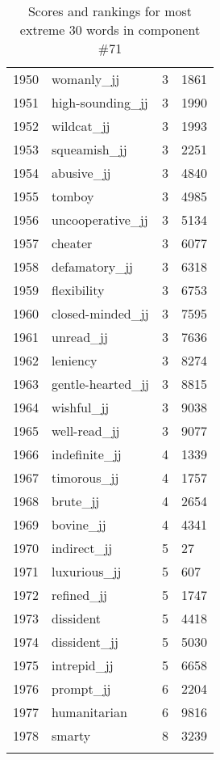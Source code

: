 \begin{longtable}[!htbp]{| rlr@{.}l |}
    1950 & womanly\_jj & 3 & 1861 \\
    1951 & high-sounding\_jj & 3 & 1990 \\
    1952 & wildcat\_jj & 3 & 1993 \\
    1953 & squeamish\_jj & 3 & 2251 \\
    1954 & abusive\_jj & 3 & 4840 \\
    1955 & tomboy & 3 & 4985 \\
    1956 & uncooperative\_jj & 3 & 5134 \\
    1957 & cheater & 3 & 6077 \\
    1958 & defamatory\_jj & 3 & 6318 \\
    1959 & flexibility & 3 & 6753 \\
    1960 & closed-minded\_jj & 3 & 7595 \\
    1961 & unread\_jj & 3 & 7636 \\
    1962 & leniency & 3 & 8274 \\
    1963 & gentle-hearted\_jj & 3 & 8815 \\
    1964 & wishful\_jj & 3 & 9038 \\
    1965 & well-read\_jj & 3 & 9077 \\
    1966 & indefinite\_jj & 4 & 1339 \\
    1967 & timorous\_jj & 4 & 1757 \\
    1968 & brute\_jj & 4 & 2654 \\
    1969 & bovine\_jj & 4 & 4341 \\
    1970 & indirect\_jj & 5 & 27 \\
    1971 & luxurious\_jj & 5 & 607 \\
    1972 & refined\_jj & 5 & 1747 \\
    1973 & dissident & 5 & 4418 \\
    1974 & dissident\_jj & 5 & 5030 \\
    1975 & intrepid\_jj & 5 & 6658 \\
    1976 & prompt\_jj & 6 & 2204 \\
    1977 & humanitarian & 6 & 9816 \\
    1978 & smarty & 8 & 3239 \\
    \hline
    \caption{Scores and rankings for most extreme 30 words in component \#71} \\
\end{longtable}
